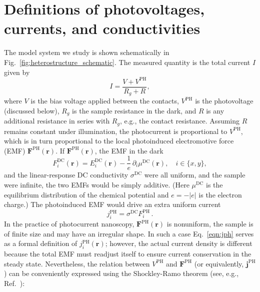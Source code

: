 \documentclass[aps, prb, reprint, superscriptaddress]{revtex4-2}
\renewcommand{\vec}{\mathbf}
\begin{document}
\section{Definitions of photovoltages, currents, and conductivities}
\label{sec:mechanisms} 

The model system we study is shown schematically in Fig.~\ref{fig:heterostructure_schematic}.
The measured quantity is the total current $I$ given by
\begin{equation}
	I = \frac{V + V^{\mathrm{PH}}}{R_g + R}, 
	\label{eqn:I_aux}
\end{equation}
where $V$ is the bias voltage applied between the contacts, $V^{\mathrm{PH}}$ is the photovoltage (discussed below),
$R_g$ is the sample resistance in the dark,
and $R$ is any additional resistance in series with $R_g$, e.g., the contact resistance.
Assuming $R$ remains constant under illumination, the photocurrent is proportional to $V^{\mathrm{PH}}$,
which is in turn proportional to the local photoinduced electromotive force (EMF) $\vec{F}^{\mathrm{PH}}(\vec{r})$.
If $\vec{F}^{\mathrm{PH}}(\vec{r})$,
the EMF in the dark
\begin{equation}
	F_i^\mathrm{DC}(\vec{r})
	= E_i^\mathrm{DC}(\vec{r}) - \frac{1}{e}\, \partial_i \mu^\mathrm{DC}(\vec{r}),
	\quad i \in \{x, y\},
	\label{eqn:F_DC}  
\end{equation}
and the linear-response DC conductivity
$\sigma^\mathrm{DC}$ were all uniform, and the sample were
infinite,
the two EMFs would be simply additive.
(Here $\mu^\mathrm{DC}$ is the equilibrium distribution of the chemical potential and
$e = -|e|$ is the electron charge.)
The photoinduced EMF would drive an extra uniform current
\begin{equation}
	j_i^\mathrm{PH} = \sigma^\mathrm{DC} F_i^{\mathrm{PH}}\,. 
	\label{eqn:jph}  
\end{equation}
In the practice of photocurrent nanoscopy, $\vec{F}^{\mathrm{PH}}(\vec{r})$ is nonuniform,
the sample is of finite size and may have an irregular shape.
In such a case Eq.~\eqref{eqn:jph} serves as a formal definition of $j_i^\mathrm{PH}(\vec{r})$;
however, the actual current density is different because the total EMF must readjust itself to ensure current conservation in the steady state.
Nevertheless, the relation between $V^{\mathrm{PH}}$ and $\vec{F}^{\mathrm{PH}}$
(or equivalently, $\mathbf{j}^\mathrm{PH}$)
can be conveniently expressed using the Shockley-Ramo theorem (see, e.g., Ref.~\cite{Song2014}):
\end{document}
